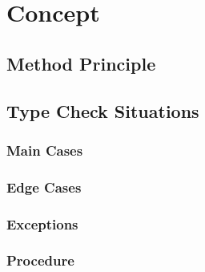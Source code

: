 
\chapter{Concept}
\label{cha:concept}

\section{Method Principle}
\label{sec:method-principle}

\section{Type Check Situations}
\label{sec:type-check-situations}

\subsection{Main Cases}
\label{sec:main-cases}

\subsection{Edge Cases}
\label{sec:edge-cases}

\subsection{Exceptions}
\label{sec:exceptions}

\subsection{Procedure}
\label{sec:procedure}